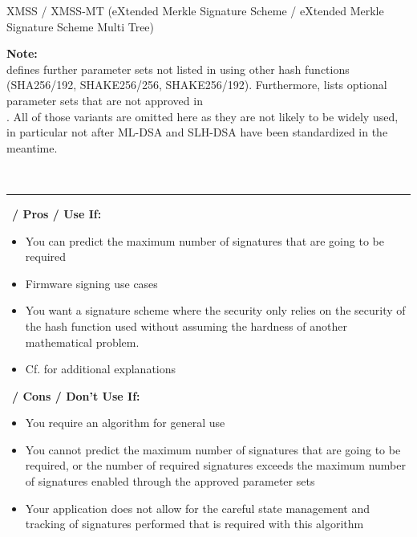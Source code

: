 \begin{algorithmbox}{XMSS / XMSS-MT (eXtended Merkle Signature Scheme / eXtended Merkle Signature Scheme Multi Tree)}
\begin{minipage}[t]{0.64\textwidth}
        {\bfseries Note:}\\
        \normalfont{} defines further parameter sets not listed in  using other hash functions (SHA256/192, SHAKE256/256, SHAKE256/192). Furthermore,  lists optional parameter sets that are not approved in\\ . All of those variants are omitted here as they are not likely to be widely used, in particular not after ML-DSA and SLH-DSA have been standardized in the meantime.
    \end{minipage}\\
    \hrule
    \vspace{1\baselineskip}
    \begin{minipage}[t]{0.49\textwidth}
        \scriptsize\faThumbsUp\, {\bfseries / Pros / Use If:}
        \begin{itemize}[leftmargin=*]
            \setlength\itemsep{0em}
            \item You can predict the maximum number of signatures that are going to be required
            \item Firmware signing use cases
            \item You want a signature scheme where the security only relies on the security of the hash function used without assuming the hardness of another mathematical problem.
            \item Cf.  for additional explanations
        \end{itemize}
    \end{minipage}
    \hfill
    \begin{minipage}[t]{0.49\textwidth}
        \scriptsize \faThumbsDown\, {\bfseries / Cons / Don't Use If:}
        \begin{itemize}[leftmargin=*]
            \setlength\itemsep{0em}
            \item You require an algorithm for general use
            \item You cannot predict the maximum number of signatures that are going to be required, or the number of required signatures exceeds the maximum number of signatures enabled through the approved parameter sets
            \item Your application does not allow for the careful state management and tracking of signatures performed that is required with this algorithm
        \end{itemize}
    \end{minipage}
\end{algorithmbox}
